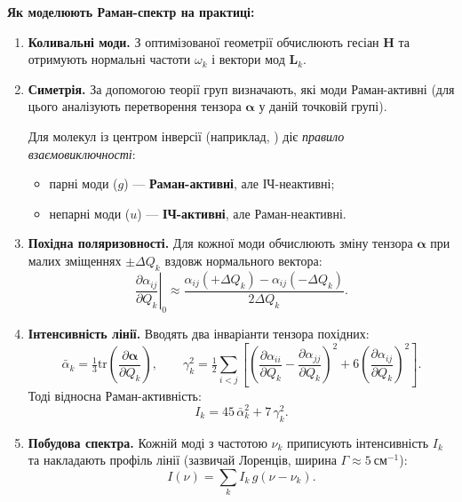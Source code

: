 \vspace{1em}
\textbf{Як моделюють Раман-спектр на практиці:}
\begin{enumerate}
    \item \textbf{Коливальні моди.}
    З оптимізованої геометрії обчислюють гесіан $\mathbf{H}$ та отримують нормальні частоти $\omega_k$ і вектори мод $\mathbf{L}_k$.

    \item \textbf{Симетрія.}
    За допомогою теорії груп визначають, які моди Раман-активні (для цього аналізують перетворення тензора $\boldsymbol{\alpha}$ у даній точковій групі).

    Для молекул із центром інверсії (наприклад, ) діє \emph{правило взаємовиключності}:
    \begin{itemize}
        \item парні моди ($g$) — \textbf{Раман-активні}, але ІЧ-неактивні;
        \item непарні моди ($u$) — \textbf{ІЧ-активні}, але Раман-неактивні.
    \end{itemize}

    \item \textbf{Похідна поляризовності.}
    Для кожної моди обчислюють зміну тензора $\boldsymbol{\alpha}$ при малих зміщеннях $\pm\Delta Q_k$ вздовж нормального вектора:
    \[
    \left. \frac{\partial \alpha_{ij}}{\partial Q_k} \right|_0
    \approx
    \frac{\alpha_{ij}(+\Delta Q_k) - \alpha_{ij}(-\Delta Q_k)}{2\Delta Q_k}.
    \]

    \item \textbf{Інтенсивність лінії.}
    Вводять два інваріанти тензора похідних:
    \[
    \bar{\alpha}_k = \tfrac{1}{3} \mathrm{tr}\!\left(\frac{\partial \boldsymbol{\alpha}}{\partial Q_k}\right),
    \qquad
    \gamma_k^2 = \tfrac{1}{2}\!\!\sum_{i<j}\!\!\left[\!
    \left(\frac{\partial \alpha_{ii}}{\partial Q_k} - \frac{\partial \alpha_{jj}}{\partial Q_k}\right)^{\!2}
    + 6\!\left(\frac{\partial \alpha_{ij}}{\partial Q_k}\right)^{\!2}\right]\!.
    \]
    Тоді відносна Раман-активність:
    \[
    I_k = 45\,\bar{\alpha}_k^2 + 7\,\gamma_k^2.
    \]

    \item \textbf{Побудова спектра.}
    Кожній моді з частотою $\nu_k$ приписують інтенсивність $I_k$ та накладають профіль лінії (зазвичай Лоренців, ширина $\Gamma \approx 5~\text{см}^{-1}$):
    \[
    I(\nu) = \sum_k I_k \, g(\nu - \nu_k).
    \]
\end{enumerate}

